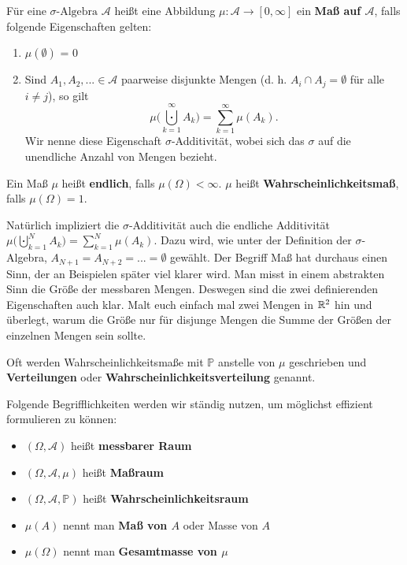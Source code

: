 \begin{deff}
Für eine $\sigma\text{-Algebra } \mathcal{A}$ heißt eine Abbildung $\mu \! : \mathcal{A} \to [0, \infty]$ ein \textbf{Maß auf $\mathcal{A}$}, falls folgende Eigenschaften gelten:
\begin{enumerate}[label=(\roman*)]
	\item $\mu (\emptyset)$ = 0
	\item Sind $A_{1}, A_{2},...\in \mathcal{A}$ paarweise disjunkte Mengen (d. h. $A_i\cap A_j=\emptyset$ f\"ur alle $i\neq j$), so gilt $$\mu\Big(\bigcupdot\limits_{k=1}^{\infty}A_{k}\Big)=\sum\limits_{k=1}^{\infty}\mu (A_{k}).$$ Wir nenne diese Eigenschaft $\sigma$-Additivität, wobei sich das $\sigma$ auf die unendliche Anzahl von Mengen bezieht. 
\end{enumerate}

Ein Ma\ss{} $\mu$ heißt \textbf{endlich}, falls $\mu (\Omega) < \infty$. $\mu$ heißt \textbf{Wahrscheinlichkeitsmaß}, falls $\mu (\Omega) = 1$.
\end{deff}
Nat\"urlich impliziert die $\sigma$-Additivit\"at auch die endliche Additivit\"at $\mu\Big(\bigcupdot\limits_{k=1}^{N}A_{k}\Big)=\sum\limits_{k=1}^{N}\mu (A_{k}).$ Dazu wird, wie unter der Definition der $\sigma$-Algebra, $A_{N+1}=A_{N+2}=...=\emptyset$ gew\"ahlt. Der Begriff \glqq Ma\ss \grqq{} hat durchaus einen Sinn, der an Beispielen sp\"ater viel klarer wird. Man misst in einem abstrakten Sinn die Gr\"o\ss e der messbaren Mengen. Deswegen sind die zwei definierenden Eigenschaften auch klar. Malt euch einfach mal zwei Mengen in $\mathbb{R}^2$ hin und \"uberlegt, warum die \glqq Gr\"o\ss e\grqq{} nur f\"ur disjunge Mengen die Summe der \glqq Gr\"o\ss en\grqq{} der einzelnen Mengen sein sollte.


\begin{bem} 
Oft werden Wahrscheinlichkeitsmaße mit $\mathbb P$ anstelle von $\mu$ geschrieben und \textbf{Verteilungen} oder \textbf{Wahrscheinlichkeitsverteilung} genannt.

\end{bem}
Folgende Begrifflichkeiten werden wir st\"andig nutzen, um m\"oglichst effizient formulieren zu k\"onnen: 
\begin{deff} \abs
	\begin{itemize}
		\item $(\Omega, \mathcal{A})$ heißt \textbf{messbarer Raum}
		\item $(\Omega, \mathcal{A}, \mu)$ heißt \textbf{Maßraum}
		\item $(\Omega, \mathcal{A}, \mathbb P)$ heißt \textbf{Wahrscheinlichkeitsraum}
		\item $\mu (A)$ nennt man \textbf{Maß von $A$} oder Masse von $A$
		\item $\mu(\Omega)$ nennt man \textbf{Gesamtmasse von $\mu$}
	\end{itemize}

\end{deff}

